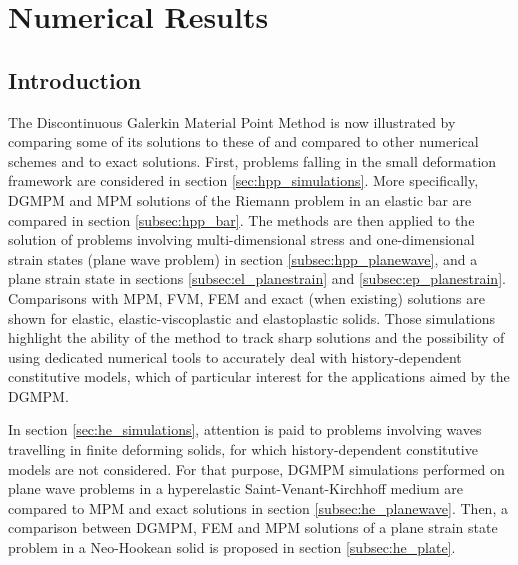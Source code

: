 \chapter{Numerical Results}
\section*{Introduction}
The Discontinuous Galerkin Material Point Method is now illustrated by comparing some of its solutions to these of and compared to other numerical schemes and to exact solutions.
First, problems falling in the small deformation framework are considered in section \ref{sec:hpp_simulations}. More specifically, DGMPM and MPM solutions of the Riemann problem in an elastic bar are compared in section \ref{subsec:hpp_bar}. The methods are then applied to the solution of problems involving multi-dimensional stress and one-dimensional strain states (plane wave problem) in section \ref{subsec:hpp_planewave}, and a plane strain state in sections \ref{subsec:el_planestrain} and \ref{subsec:ep_planestrain}. Comparisons with MPM, FVM, FEM and exact (when existing) solutions are shown for elastic, elastic-viscoplastic and elastoplastic solids.
Those simulations highlight the ability of the method to track sharp solutions and the possibility of using dedicated numerical tools to accurately deal with history-dependent constitutive models, which of particular interest for the applications aimed by the DGMPM. %

In section \ref{sec:he_simulations}, attention is paid to problems involving waves travelling in finite deforming solids, for which history-dependent constitutive models are not considered.
For that purpose, DGMPM simulations performed on plane wave problems in a hyperelastic Saint-Venant-Kirchhoff medium are compared to MPM and exact solutions in section \ref{subsec:he_planewave}. Then, a comparison between DGMPM, FEM and MPM solutions of a plane strain state problem in a Neo-Hookean solid is proposed in section \ref{subsec:he_plate}.

